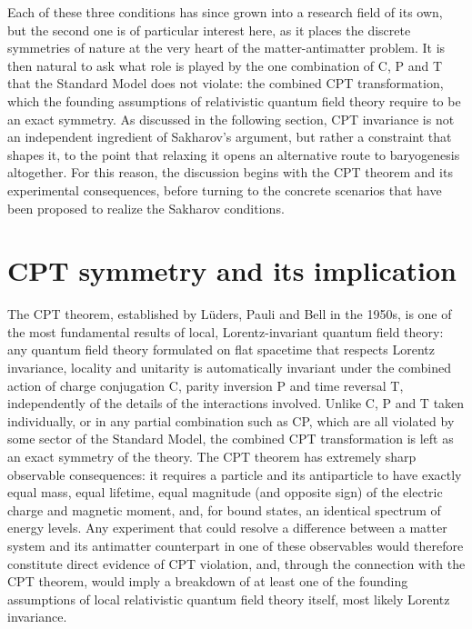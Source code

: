 Each of these three conditions has since grown into a research field of its own, but the second one is of particular interest here, as it places the discrete symmetries of nature at the very heart of the matter-antimatter problem. It is then natural to ask what role is played by the one combination of C, P and T that the Standard Model does not violate: the combined CPT transformation, which the founding assumptions of relativistic quantum field theory require to be an exact symmetry. As discussed in the following section, CPT invariance is not an independent ingredient of Sakharov's argument, but rather a constraint that shapes it, to the point that relaxing it opens an alternative route to baryogenesis altogether. For this reason, the discussion begins with the CPT theorem and its experimental consequences, before turning to the concrete scenarios that have been proposed to realize the Sakharov conditions.


\section{CPT symmetry and its implication}

The CPT theorem, established by L\"uders, Pauli and Bell in the 1950s, is one of the most fundamental results of local, Lorentz-invariant quantum field theory: any quantum field theory formulated on flat spacetime that respects Lorentz invariance, locality and unitarity is automatically invariant under the combined action of charge conjugation C, parity inversion P and time reversal T, independently of the details of the interactions involved. Unlike C, P and T taken individually, or in any partial combination such as CP, which are all violated by some sector of the Standard Model, the combined CPT transformation is left as an exact symmetry of the theory. The CPT theorem has extremely sharp observable consequences: it requires a particle and its antiparticle to have exactly equal mass, equal lifetime, equal magnitude (and opposite sign) of the electric charge and magnetic moment, and, for bound states, an identical spectrum of energy levels. Any experiment that could resolve a difference between a matter system and its antimatter counterpart in one of these observables would therefore constitute direct evidence of CPT violation, and, through the connection with the CPT theorem, would imply a breakdown of at least one of the founding assumptions of local relativistic quantum field theory itself, most likely Lorentz invariance.

